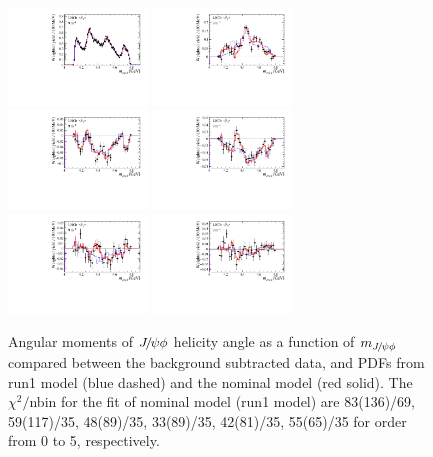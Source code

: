 \begin{figure}[htbp]
\centering
\includegraphics[width=0.33\textwidth]{Figures/03_Zcs/app_moments/shyphi0}%
\includegraphics[width=0.33\textwidth]{Figures/03_Zcs/app_moments/shyphi1}%
\includegraphics[width=0.33\textwidth]{Figures/03_Zcs/app_moments/shyphi2}
\includegraphics[width=0.33\textwidth]{Figures/03_Zcs/app_moments/shyphi3}%
\includegraphics[width=0.33\textwidth]{Figures/03_Zcs/app_moments/shyphi4}%
\includegraphics[width=0.33\textwidth]{Figures/03_Zcs/app_moments/shyphi5}
\caption{Angular moments of ${{J\mskip -3mu/\mskip -2mu\psi}} \phi$ helicity angle as a function of $m_{{{J\mskip -3mu/\mskip -2mu\psi}} \phi}$ compared between the background subtracted data, and PDFs from run1 model (blue dashed) and the nominal model (red solid). The $\chi^2/$nbin for the fit of nominal model (run1 model) are 83(136)/69, 59(117)/35, 48(89)/35, 33(89)/35, 42(81)/35, 55(65)/35 for order from 0 to 5, respectively.  }
\label{mom5phi}
\end{figure}



